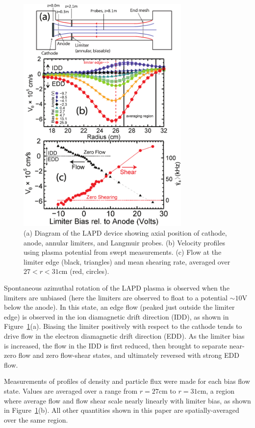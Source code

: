\documentclass[aps,prl,amsmath,amssymb,preprint,superscriptaddress]{revtex4} %
\begin{document}
\begin{figure}[!htbp]
\centerline{
\includegraphics[width=8.5cm]{figure1.eps}}
\caption{\label{fig:velocity_flowshear} (a) Diagram of the LAPD device showing axial position of cathode, anode, annular limiters, and Langmuir probes. (b) Velocity profiles using plasma potential from swept measurements. (c) Flow at the limiter edge (black, triangles) and mean shearing rate, averaged over $27 < r < 31$cm (red, circles).}
\end{figure}

Spontaneous azimuthal rotation of the LAPD plasma is observed when the limiters are
unbiased (here the limiters are observed to float to a
potential $\sim 10$V below the anode).  In this state, an edge flow
(peaked just outside the limiter edge) is
observed in the ion diamagnetic drift direction (IDD), as shown in
Figure~\ref{fig:velocity_flowshear}(a).  Biasing the limiter positively
with respect to the cathode tends to drive flow in the electron
diamagnetic drift direction (EDD).  As the limiter bias is increased, the
flow in the IDD is first reduced, then brought to separate near-zero flow
and zero flow-shear states, and ultimately reversed with strong EDD flow.

Measurements of profiles of density and particle flux
were made for each bias flow state. Values are averaged over a range
from $r=27$cm to $r=31$cm, a region where average flow and flow shear scale
nearly linearly with limiter bias, as shown in
Figure~\ref{fig:velocity_flowshear}(b).  All other quantities shown in this paper are spatially-averaged over the same region.
\end{document}
